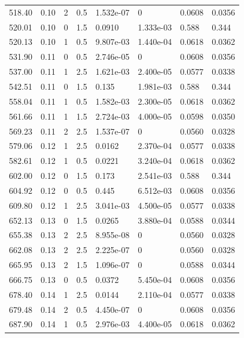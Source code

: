 \documentclass[preview]{standalone}
\begin{document}
{{{\begin{tabular}{L{1.2cm}C{1.2cm} C{0.3cm}C{0.5cm} C{1.4cm}C{1.4cm} C{1.4cm}C{1.4cm}}
  518.40  &  0.10  & 2     & 0.5 &  1.532e-07  & 0  & 0.0608 &  0.0356   \\ 
  520.01  &  0.10  & 0     & 1.5 &  0.0910  & 1.333e-03  & 0.588 &  0.344   \\ 
  520.13  &  0.10  & 1     & 0.5 &  9.807e-03  & 1.440e-04  & 0.0618 &  0.0362   \\ 
  531.90  &  0.11  & 0     & 0.5 &  2.746e-05  & 0  & 0.0608 &  0.0356   \\ 
  537.00  &  0.11  & 1     & 2.5 &  1.621e-03  & 2.400e-05  & 0.0577 &  0.0338   \\ 
  542.51  &  0.11  & 0     & 1.5 &  0.135  & 1.981e-03  & 0.588 &  0.344   \\ 
  558.04  &  0.11  & 1     & 0.5 &  1.582e-03  & 2.300e-05  & 0.0618 &  0.0362   \\ 
  561.66  &  0.11  & 1     & 1.5 &  2.724e-03  & 4.000e-05  & 0.0598 &  0.0350   \\ 
  569.23  &  0.11  & 2     & 2.5 &  1.537e-07  & 0  & 0.0560 &  0.0328   \\ 
  579.06  &  0.12  & 1     & 2.5 &  0.0162  & 2.370e-04  & 0.0577 &  0.0338   \\ 
  582.61  &  0.12  & 1     & 0.5 &  0.0221  & 3.240e-04  & 0.0618 &  0.0362   \\ 
  602.00  &  0.12  & 0     & 1.5 &  0.173  & 2.541e-03  & 0.588 &  0.344   \\ 
  604.92  &  0.12  & 0     & 0.5 &  0.445  & 6.512e-03  & 0.0608 &  0.0356   \\ 
  609.80  &  0.12  & 1     & 2.5 &  3.041e-03  & 4.500e-05  & 0.0577 &  0.0338   \\ 
  652.13  &  0.13  & 0     & 1.5 &  0.0265  & 3.880e-04  & 0.0588 &  0.0344   \\ 
  655.38  &  0.13  & 2     & 2.5 &  8.955e-08  & 0  & 0.0560 &  0.0328   \\ 
  662.08  &  0.13  & 2     & 2.5 &  2.225e-07  & 0  & 0.0560 &  0.0328   \\ 
  665.95  &  0.13  & 2     & 1.5 &  1.096e-07  & 0  & 0.0588 &  0.0344   \\ 
  666.75  &  0.13  & 0     & 0.5 &  0.0372  & 5.450e-04  & 0.0608 &  0.0356   \\ 
  678.40  &  0.14  & 1     & 2.5 &  0.0144  & 2.110e-04  & 0.0577 &  0.0338   \\ 
  679.48  &  0.14  & 2     & 0.5 &  4.450e-07  & 0  & 0.0608 &  0.0356   \\ 
  687.90  &  0.14  & 1     & 0.5 &  2.976e-03  & 4.400e-05  & 0.0618 &  0.0362   \\ 

\end{tabular}}}}
\end{document}
